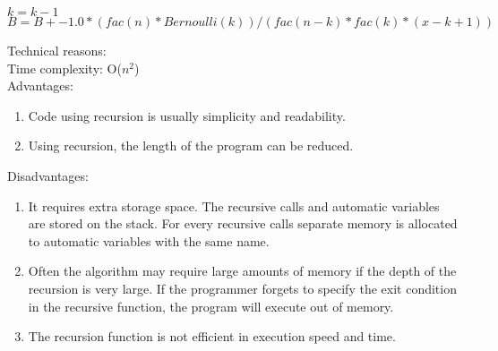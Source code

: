 \documentclass[12pt]{article}
\newcommand{\TITLE}[1]{\item[#1]}
\begin{document}
\begin{algorithmic}[1] 
  \TITLE{\textsc{Bernoulli}$(n)$}
  \ELSE
  \STATE $k=k-1$
  \STATE $B=B+ -1.0*(fac(n)*Bernoulli(k))/(fac(n-k)*fac(k)*(x-k+1))$
  \ENDWHILE
  \ENDIF
\end{algorithmic}


Technical reasons:\\


Time complexity: O($n^{2}$)\\


Advantages:\\
\begin{enumerate}
\item Code using recursion is usually simplicity and readability.
\item Using recursion, the length of the program can be reduced.\\
\end{enumerate}


Disadvantages:\\
\begin{enumerate}
\item It requires extra storage space. The recursive calls and automatic variables are stored on the stack. For every recursive calls separate memory is allocated to automatic variables with the same name.
\item Often the algorithm may require large amounts of memory if the depth of the recursion is very large. If the programmer forgets to specify the exit condition in the recursive function, the program will execute out of memory.
\item The recursion function is not efficient in execution speed and time.\\
\end{enumerate}
\end{document}
